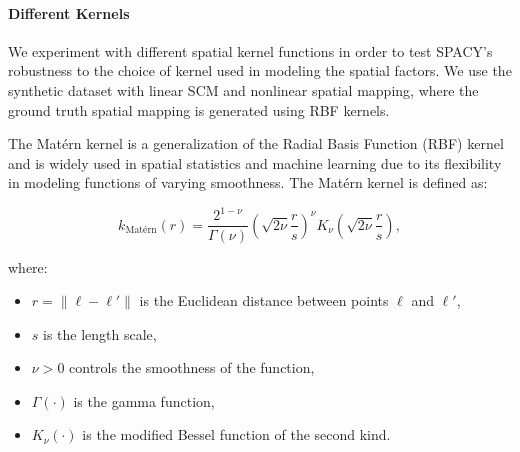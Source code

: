 





\paragraph{Different Kernels}
\label{app:diff_kernels}


We experiment with different spatial kernel functions in order to test SPACY's robustness to the choice of kernel used in modeling the spatial factors. We use the synthetic dataset with linear SCM and nonlinear spatial mapping, where the ground truth spatial mapping is generated using RBF kernels.

The Matérn kernel is a generalization of the Radial Basis Function (RBF) kernel and is widely used in spatial statistics and machine learning due to its flexibility in modeling functions of varying smoothness. The Matérn kernel is defined as:

\[
k_{\text{Matérn}}(r) = \frac{2^{1-\nu}}{\Gamma(\nu)} \left( \sqrt{2\nu} \frac{r}{s} \right)^\nu K_\nu\left( \sqrt{2\nu} \frac{r}{s} \right),
\]

where:

\begin{itemize}
    \item $r = \| \mathbf{\boldsymbol \ell} - \mathbf{\boldsymbol \ell}' \|$ is the Euclidean distance between points $\mathbf{\boldsymbol \ell}$ and $\mathbf{\boldsymbol \ell}'$,
    \item $s$ is the length scale,
    \item $\nu > 0$ controls the smoothness of the function,
    \item $\Gamma(\cdot)$ is the gamma function,
    \item $K_\nu(\cdot)$ is the modified Bessel function of the second kind.
\end{itemize}

